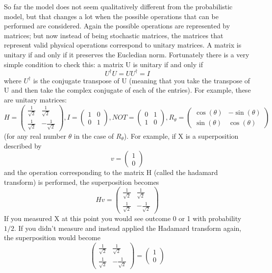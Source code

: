 So far the model does not seem qualitatively different from the probabilistic model, but that changes a lot when the possible operations that can be performed are considered. Again the possible operations are represented by matrices; but now instead of being stochastic matrices, the matrices that represent valid physical operations correspond to unitary matrices. A matrix is unitary if and only if it preserves the Eucledian norm. Fortunately there is a very simple condition to check this: a matrix U is unitary if and only if
\[
U^{\dagger}U=UU^{\dagger}=I
\]
where $U^{\dagger}$ is the conjugate transpose of U (meaning that you take the transpose of U and then take the complex conjugate of each of the entries). For example, these are unitary matrices:
\[
H=\begin{pmatrix} \frac{1}{\sqrt{2}} & \frac{1}{\sqrt{2}} \\ \frac{1}{\sqrt{2}} & -\frac{1}{\sqrt{2}} \end{pmatrix}, I=\begin{pmatrix} 1 & 0 \\0 & 1 \end{pmatrix}, NOT=\begin{pmatrix} 0 & 1 \\ 1 & 0\end{pmatrix}, R_{\theta} = \begin{pmatrix} \cos (\theta) & -\sin (\theta) \\ \sin(\theta) & \cos (\theta) \end{pmatrix}
\]
(for any real number $\theta$ in the case of $R_{\theta}$). For example, if X is a superposition described by
\[
v=\begin{pmatrix} 1 \\ 0 \end{pmatrix}
\]
and the operation corresponding to the matrix H (called the hadamard transform) is performed, the superposition becomes
\[
Hv=\begin{pmatrix} \frac{1}{\sqrt{2}} & \frac{1}{\sqrt{2}}\\\frac{1}{\sqrt{2}} & -\frac{1}{\sqrt{2}} \end{pmatrix}
\]
If you measured X at this point you would see outcome 0 or 1 with probability $1/2$. If you didn't measure and instead applied the Hadamard transform again, the superposition would become
\[
\begin{pmatrix} \frac{1}{\sqrt{2}} & \frac{1}{\sqrt{2}} \\ \frac{1}{\sqrt{2}} & -\frac{1}{\sqrt{2}} \end{pmatrix} = \begin{pmatrix} 1 \\ 0 \end{pmatrix}
\]

